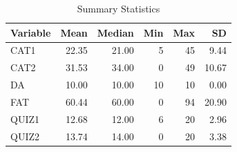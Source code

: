 \documentclass{article}\usepackage[]{graphicx}\usepackage[]{xcolor}
\begin{document}
\begin{table}[ht]
\centering
\begin{tabular}{lrrrrr}
  \hline
Variable & Mean & Median & Min & Max & SD \\ 
  \hline
CAT1 & 22.35 & 21.00 &   5 &  45 & 9.44 \\ 
  CAT2 & 31.53 & 34.00 &   0 &  49 & 10.67 \\ 
  DA & 10.00 & 10.00 &  10 &  10 & 0.00 \\ 
  FAT & 60.44 & 60.00 &   0 &  94 & 20.90 \\ 
  QUIZ1 & 12.68 & 12.00 &   6 &  20 & 2.96 \\ 
  QUIZ2 & 13.74 & 14.00 &   0 &  20 & 3.38 \\ 
   \hline
\end{tabular}
\caption{Summary Statistics} 
\end{table}
\end{document}
